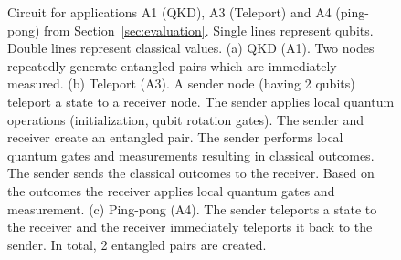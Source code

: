 \begin{figure}
    \centering

    \vspace{1cm}
    \vspace{1cm}
    \caption{
    Circuit for applications A1 (QKD), A3 (Teleport) and A4 (ping-pong) from Section~\ref{sec:evaluation}.
    Single lines represent qubits. Double lines represent classical values.
    (a) QKD (A1). Two nodes repeatedly generate entangled pairs which are immediately measured.
    (b) Teleport (A3). A sender node (having 2 qubits) teleport a state to a receiver node. The sender applies local quantum operations (initialization, qubit rotation gates).
    The sender and receiver create an entangled pair. The sender performs local quantum gates and measurements resulting in classical outcomes.
    The sender sends the classical outcomes to the receiver. Based on the outcomes the receiver applies local quantum gates and measurement.
    (c) Ping-pong (A4). The sender teleports a state to the receiver and the receiver immediately teleports it back to the sender. In total, 2 entangled pairs are created.
    }
    \label{fig:app:circuits_1}
\end{figure}


